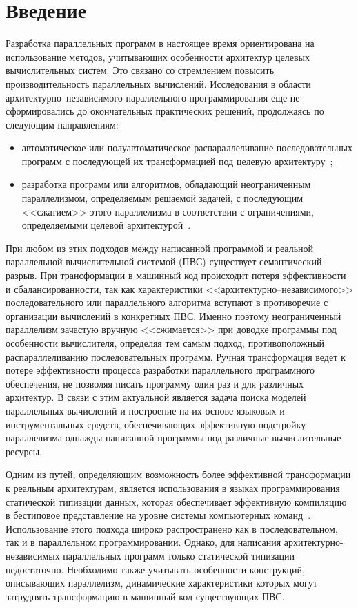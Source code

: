 \chapter*{Введение}
\label{intro}

Разработка параллельных программ в настоящее время ориентирована на использование методов, учитывающих особенности архитектур целевых вычислительных систем. Это связано со стремлением повысить производительность параллельных вычислений. Исследования в области архитектурно--независимого параллельного программирования еще не сформировались до окончательных практических решений, продолжаясь по следующим направлениям:
\begin{itemize}
	\item автоматическое или полуавтоматическое распараллеливание последовательных программ с последующей их трансформацией под целевую архитектуру~\cite{seq-par-01};
	\item разработка программ или алгоритмов, обладающий неограниченным параллелизмом, определяемым решаемой задачей, с последующим <<сжатием>> этого параллелизма в соответствии с ограничениями, определяемыми целевой архитектурой~\cite{aipp}.
\end{itemize}

При любом из этих подходов между написанной программой и реальной параллельной вычислительной системой (ПВС) существует семантический разрыв. При трансформации в машинный код происходит потеря эффективности и сбалансированности, так как характеристики <<архитектурно--независимого>> последовательного или параллельного алгоритма вступают в противоречие с организации вычислений в конкретных ПВС. Именно поэтому неограниченный параллелизм зачастую вручную <<сжимается>> при доводке программы под особенности вычислителя, определяя тем самым подход, противоположный распараллеливанию последовательных программ. Ручная трансформация ведет к потере эффективности процесса разработки параллельного программного обеспечения, не позволяя писать программу один раз и для различных архитектур. В связи с этим актуальной является задача поиска моделей параллельных вычислений и построение на их основе языковых и инструментальных средств, обеспечивающих эффективную подстройку параллелизма однажды написанной программы под различные вычислительные ресурсы.

Одним из путей, определяющим возможность более эффективной трансформации к реальным архитектурам, является использования в языках программирования статической типизации данных, которая обеспечивает эффективную компиляцию в бестиповое представление на уровне системы компьютерных команд~\cite{types}. Использование этого подхода широко распространено как в последовательном, так и в параллельном программировании. Однако, для написания архитектурно-независимых параллельных программ только статической типизации недостаточно. Необходимо также учитывать особенности конструкций, описывающих параллелизм, динамические характеристики которых могут затруднять трансформацию в машинный код существующих ПВС.


